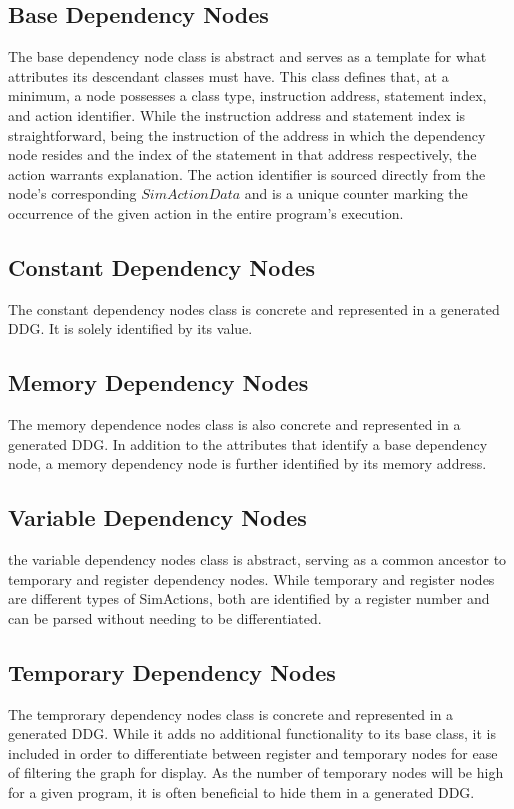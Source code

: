 \subsection{Base Dependency Nodes}
The base dependency node class is abstract and serves as a template for what attributes its descendant classes must have. This class defines that, at a minimum, a node possesses a class type, instruction address, statement index, and action identifier. While the instruction address and statement index is straightforward, being the instruction of the address in which the dependency node resides and the index of the statement in that address respectively, the action warrants explanation. The action identifier is sourced directly from the node’s corresponding $SimActionData$ and is a unique counter marking the occurrence of the given action in the entire program’s execution. 

\subsection{Constant Dependency Nodes}
The constant dependency nodes class is concrete and represented in a generated DDG. It is solely identified by its value.

\subsection{Memory Dependency Nodes}
The memory dependence nodes class is also concrete and represented in a generated DDG. In addition to the attributes that identify a base dependency node, a memory dependency node is further identified by its memory address. 

\subsection{Variable Dependency Nodes}
the variable dependency nodes class is abstract, serving as a common ancestor to temporary and register dependency nodes. While temporary and register nodes are different types of SimActions, both are identified by a register number and can be parsed without needing to be differentiated. 

\subsection{Temporary Dependency Nodes}
\label{section:tmp}
The temprorary dependency nodes class is concrete and represented in a generated DDG. While it adds no additional functionality to its base class, it is included in order to differentiate between register and temporary nodes for ease of filtering the graph for display. As the number of temporary nodes will be high for a given program, it is often beneficial to hide them in a generated DDG. 

